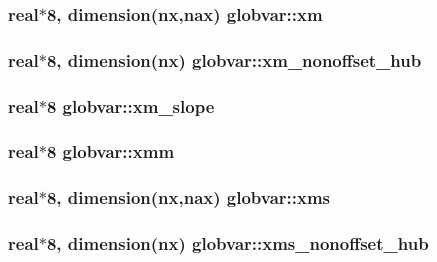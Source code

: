 \subsubsection[{xm}]{\setlength{\rightskip}{0pt plus 5cm}real$\ast$8, dimension({\bf nx},{\bf nax}) globvar\+::xm}\label{namespaceglobvar_aa5ba5cdfdecc13b0a215ac7e8bee5b9f}
\hypertarget{namespaceglobvar_a43680257555ebbaba3cd4de3408e11cf}{}
\subsubsection[{xm\+\_\+nonoffset\+\_\+hub}]{\setlength{\rightskip}{0pt plus 5cm}real$\ast$8, dimension({\bf nx}) globvar\+::xm\+\_\+nonoffset\+\_\+hub}\label{namespaceglobvar_a43680257555ebbaba3cd4de3408e11cf}
\hypertarget{namespaceglobvar_acec26aa18c34a950efbf95fbe83fb5e3}{}
\subsubsection[{xm\+\_\+slope}]{\setlength{\rightskip}{0pt plus 5cm}real$\ast$8 globvar\+::xm\+\_\+slope}\label{namespaceglobvar_acec26aa18c34a950efbf95fbe83fb5e3}
\hypertarget{namespaceglobvar_aab6536b56504cc8d4eafd8e083c061b3}{}
\subsubsection[{xmm}]{\setlength{\rightskip}{0pt plus 5cm}real$\ast$8 globvar\+::xmm}\label{namespaceglobvar_aab6536b56504cc8d4eafd8e083c061b3}
\hypertarget{namespaceglobvar_a955f6af8ca3ef2d2ad1dc152f84503a6}{}
\subsubsection[{xms}]{\setlength{\rightskip}{0pt plus 5cm}real$\ast$8, dimension({\bf nx},{\bf nax}) globvar\+::xms}\label{namespaceglobvar_a955f6af8ca3ef2d2ad1dc152f84503a6}
\hypertarget{namespaceglobvar_a4fce94b892f139d05a7972fbea0d4a8c}{}
\subsubsection[{xms\+\_\+nonoffset\+\_\+hub}]{\setlength{\rightskip}{0pt plus 5cm}real$\ast$8, dimension({\bf nx}) globvar\+::xms\+\_\+nonoffset\+\_\+hub}\label{namespaceglobvar_a4fce94b892f139d05a7972fbea0d4a8c}
\hypertarget{namespaceglobvar_a117b11c9bdd95f9e6a9c27dc6ac426a1}{}
